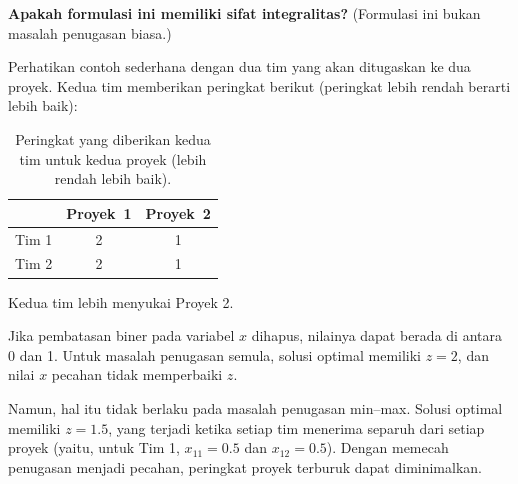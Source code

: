 \medskip \textbf{Apakah formulasi ini memiliki sifat integralitas?}  
(Formulasi ini bukan masalah penugasan biasa.)

Perhatikan contoh sederhana dengan dua tim yang akan ditugaskan ke dua proyek. Kedua tim memberikan peringkat berikut (peringkat lebih rendah berarti lebih baik):

\begin{table}[h!] 
\begin{center} 
\begin{tabular} {|c||c|c|}
\hline           & Proyek~1 & Proyek~2 \\ \hline \hline
Tim 1    & 2  & 1  \\
Tim 2    & 2  & 1 \\ \hline
\end{tabular} 
\end{center} 
\caption{Peringkat yang diberikan kedua tim untuk kedua proyek (lebih rendah lebih baik).}\label{tab:modeling-sums-tab04}%
\end{table}

Kedua tim lebih menyukai Proyek 2.

Jika pembatasan biner pada variabel \(x\) dihapus, nilainya dapat berada di antara 0 dan 1.  
Untuk masalah penugasan semula, solusi optimal memiliki \(z=2\), dan nilai \(x\) pecahan tidak memperbaiki \(z\).  

Namun, hal itu tidak berlaku pada masalah penugasan min–max. Solusi optimal memiliki \(z=1.5\), yang terjadi ketika setiap tim menerima separuh dari setiap proyek (yaitu, untuk Tim 1, \(x_{11} = 0.5\) dan \(x_{12} = 0.5\)). Dengan memecah penugasan menjadi pecahan, peringkat proyek terburuk dapat diminimalkan.

